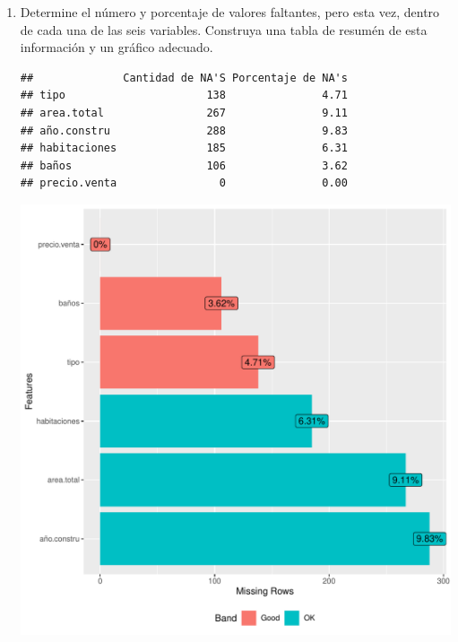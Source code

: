 \documentclass[9pt,letterpaper]{article}\usepackage[]{graphicx}\usepackage[]{color}
\makeatletter
\def\maxwidth{ %
  \ifdim\Gin@nat@width>\linewidth
    \linewidth
  \else
    \Gin@nat@width
  \fi
}
\newenvironment{kframe}{%
 \def\at@end@of@kframe{}%
 \ifinner\ifhmode%
  \def\at@end@of@kframe{\end{minipage}}%
  \begin{minipage}{\columnwidth}%
 \fi\fi%
 \def\FrameCommand##1{\hskip\@totalleftmargin \hskip-\fboxsep
 \colorbox{shadecolor}{##1}\hskip-\fboxsep
     \hskip-\linewidth \hskip-\@totalleftmargin \hskip\columnwidth}%
 \MakeFramed {\advance\hsize-\width
   \@totalleftmargin\z@ \linewidth\hsize
   \@setminipage}}%
 {\par\unskip\endMakeFramed%
 \at@end@of@kframe}
\newenvironment{knitrout}{}{} %
\makeatother
\begin{document}
\begin{enumerate}
  \item  Determine el número y porcentaje de valores faltantes, pero esta vez, dentro de cada una de las seis variables. Construya una tabla de resumén de esta información y un gráfico adecuado.
\begin{knitrout}
\color{fgcolor}\begin{kframe}
\begin{verbatim}
##              Cantidad de NA'S Porcentaje de NA's
## tipo                      138               4.71
## area.total                267               9.11
## año.constru               288               9.83
## habitaciones              185               6.31
## baños                     106               3.62
## precio.venta                0               0.00
\end{verbatim}
\end{kframe}
\includegraphics[width=\maxwidth]{figure/unnamed-chunk-4-1} 


\end{knitrout}
\end{enumerate}
\end{document}
